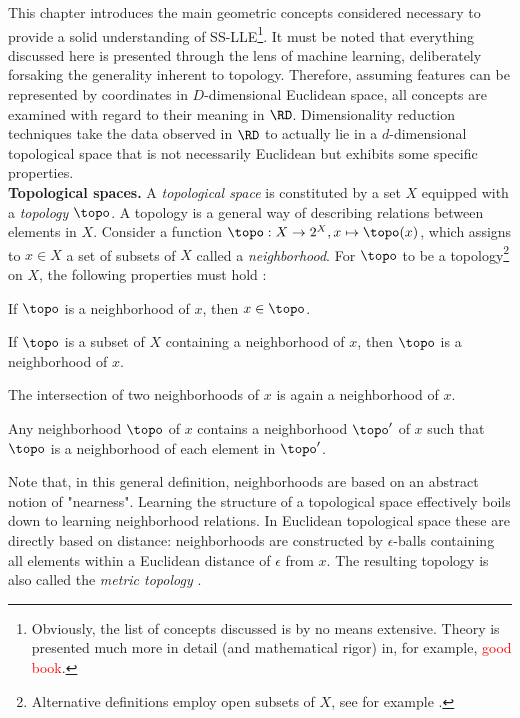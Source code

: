 This chapter introduces the main geometric concepts considered necessary to
provide a solid understanding of SS-LLE\footnote{
Obviously, the list of concepts discussed is by no means extensive. Theory is
presented much more in detail (and mathematical rigor) in, for example, 
\textcolor{red}{good book}.
}.
It must be noted that everything discussed here is presented through the lens of
machine learning, deliberately forsaking the generality inherent to topology.
Therefore, assuming features can be represented by coordinates in 
$D$-dimensional Euclidean space, all concepts are examined with regard to their
meaning in $\RD$.
Dimensionality reduction techniques take the data observed in $\RD$ to actually
lie in a $d$-dimensional topological space that is not necessarily Euclidean but
exhibits some specific properties.
\\


\textbf{Topological spaces.} A \textit{topological space} is constituted by a 
set $X$ equipped with a \textit{topology} $\topo$. 
A topology is a general way of describing relations between elements in $X$.
Consider a function $\topo: X \rightarrow 2^X, x \mapsto \topo(x)$, which 
assigns to $x \in X$ a set of subsets of $X$ called a \textit{neighborhood}.
For $\topo$ to be a topology\footnote{
Alternative definitions employ open subsets of $X$, see for example 
\citet{waldmann2014}.
}
on $X$, the following properties must hold \citep{brown2006}:
\begin{tight_enumerate}
  \item If $\topo$ is a neighborhood of $x$, then $x \in \topo$.
  \item If $\topo$ is a subset of $X$ containing a neighborhood of $x$, then 
  $\topo$ is a neighborhood of $x$.
  \item The intersection of two neighborhoods of $x$ is again a neighborhood of
  $x$.
  \item Any neighborhood $\topo$ of $x$ contains a neighborhood $\topo^{\prime}$ 
  of $x$ such that $\topo$ is a neighborhood of each element in 
  $\topo^{\prime}$.
\end{tight_enumerate}

Note that, in this general definition, neighborhoods are based on an abstract
notion of "nearness". 
Learning the structure of a topological space effectively boils down to learning 
neighborhood relations.
In Euclidean topological space these are directly based on distance: 
neighborhoods are constructed by $\epsilon$-balls containing all elements within 
a Euclidean distance of $\epsilon$ from $x$. 
The resulting topology is also called the \textit{metric topology} 
\citep{mccleary2006}.

